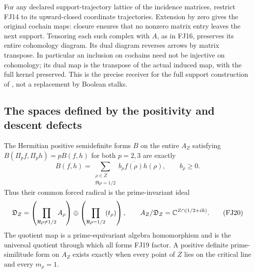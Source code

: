 For any declared support-trajectory lattice of the incidence matrices,
restrict FJ14 to its upward-closed coordinate trajectories. Extension
by zero gives the original cochain maps: closure ensures that no
nonzero matrix entry leaves the next support. Tensoring each such
complex with $A$, as in FJ16, preserves its entire cohomology diagram.
Its dual diagram reverses arrows by matrix transpose. In particular
an inclusion on cochains need not be injective on cohomology; its
dual map is the transpose of the actual induced map, with the full
kernel preserved. This is the precise receiver for the full support
construction of \cite{FJsupport}, not a replacement by Boolean stalks.

\subsection{The spaces defined by the positivity and descent defects}
\begin{theorem}
\label{fj:thm:psd}
The Hermitian positive semidefinite forms $B$ on the entire $A_Z$
satisfying $B(\Pi_pf,\Pi_ph)=pB(f,h)$ for both $p=2,3$ are exactly
\[
 B(f,h)=\sum_{\substack{\rho\in Z\\\Re\rho=1/2}}
             b_\rho\overline{f(\rho)}h(\rho),\qquad b_\rho\ge0.
 \tag{FJ19}\label{fj:fj:psd}
\]
Thus their common forced radical is the prime-invariant ideal
\[
 \mathfrak D_Z=
 \left(\prod_{\Re\rho\ne1/2}A_\rho\right)
 \oplus\left(\prod_{\Re\rho=1/2}(t_\rho)\right),
 \qquad A_Z/\mathfrak D_Z=\mathbb C^{Z\cap(1/2+i\mathbb R)}.
 \tag{FJ20}\label{fj:fj:defect}
\]
The quotient map is a prime-equivariant algebra homomorphism and is
the universal quotient through which all forms FJ19 factor. A positive
definite prime-similitude form on $A_Z$ exists exactly when every point
of $Z$ lies on the critical line and every $m_\rho=1$.
\end{theorem}
